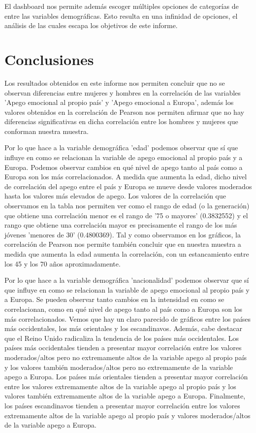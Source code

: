 \documentclass{article}
\begin{document}
\noindent El dashboard nos permite además escoger múltiples opciones de categorías de entre las variables demográficas. Esto resulta en una infinidad de opciones, el análisis de las cuales escapa los objetivos de este informe.

\newpage
\section*{Conclusiones}

\noindent Los resultados obtenidos en este informe nos permiten concluir que no se observan diferencias entre mujeres y hombres en la correlación de las variables 'Apego emocional al propio país' y 'Apego emocional a Europa', además los valores obtenidos en la correlación de Pearson nos permiten afirmar que no hay diferencias significativas en dicha correlación entre los hombres y mujeres que conforman nuestra muestra.


\noindent Por lo que hace a la variable demográfica 'edad' podemos observar que sí que influye en como se relacionan la variable de apego emocional al propio país y a Europa. Podemos observar cambios en qué nivel de apego tanto al país como a Europa son los más correlacionados. A medida que aumenta la edad, dicho nivel de correlación del apego entre el país y Europa se mueve desde valores moderados hasta los valores más elevados de apego. Los valores de la correlación que observamos en la tabla nos permiten ver como el rango de edad (o la generación) que obtiene una correlación menor es el rango de '75 o mayores' (0.3832552) y el rango que obtiene una correlación mayor es precisamente el rango de los más jóvenes 'menores de 30' (0.4800369). Tal y como observamos en los gráficos, la correlación de Pearson nos permite también concluir que en nuestra muestra a medida que aumenta la edad aumenta la correlación, con un estancamiento entre los 45 y los 70 años aproximadamente.


\noindent Por lo que hace a la variable demográfica 'nacionalidad' podemos observar que sí que influye en como se relacionan la variable de apego emocional al propio país y a Europa. Se pueden observar tanto cambios en la intensidad en como se correlacionan, como en qué nivel de apego tanto al país como a Europa son los más correlacionados. Vemos que hay un claro parecido de gráficos entre los países más occidentales, los más orientales y los escandinavos. Además, cabe destacar que el Reino Unido radicaliza la tendencia de los países más occidentales. Los países más occidentales tienden a presentar mayor correlación entre los valores moderados/altos pero no extremamente altos de la variable apego al propio país y los valores también moderados/altos pero no extremamente de la variable apego a Europa. Los países más orientales tienden a presentar mayor correlación entre los valores extremamente altos de la variable apego al propio país y los valores también extremamente altos de la variable apego a Europa. Finalmente, los países escandinavos tienden a presentar mayor correlación entre los valores extremamente altos de la variable apego al propio país y valores moderados/altos de la variable apego a Europa.
\end{document}
